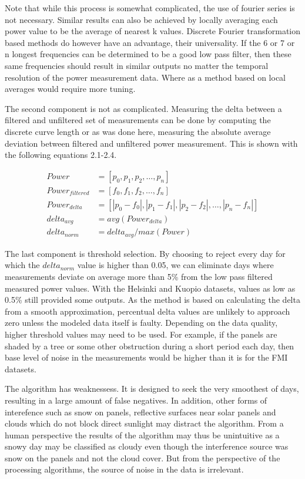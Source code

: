 Note that while this process is somewhat complicated, the use of fourier series is not necessary. Similar results can also be achieved by locally averaging each power value to be the average of nearest k values. Discrete Fourier transformation based methods do however have an advantage, their universality. If the 6 or 7 or n longest frequencies can be determined to be a good low pass filter, then these same frequencies should result in similar outputs no matter the temporal resolution of the power measurement data. Where as a method based on local averages would require more tuning.

The second component is not as complicated. Measuring the delta between a filtered and unfiltered set of measurements can be done by computing the discrete curve length or as was done here, measuring the absolute average deviation between filtered and unfiltered power measurement. This is shown with the following equations 2.1-2.4.


\begin{align}
Power &= [p_0, p_1, p_2, \dots , p_n] \\
Power_{filtered} &= [f_0, f_1, f_2, \dots , f_n] \\
Power_{delta} &= [|p_0 - f_0|, |p_1-f_1|, |p_2-f_2|, \dots , |p_n-f_n|] \\
delta_{avg} &= avg(Power_{delta}) \\
delta_{norm} &= delta_{avg}/ max(Power)
\end{align}


The last component is threshold selection. By choosing to reject every day for which the $delta_{norm}$ value is higher than 0.05, we can eliminate days where measurements deviate on average more than 5\% from the low pass filtered measured power values. With the Helsinki and Kuopio datasets, values as low as 0.5\% still provided some outputs. As the method is based on calculating the delta from a smooth approximation, percentual delta values are unlikely to approach zero unless the modeled data itself is faulty. Depending on the data quality, higher threshold values may need to be used. For example, if the panels are shaded by a tree or some other obstruction during a short period each day, then base level of noise in the measurements would be higher than it is for the FMI datasets.


The algorithm has weaknessess. It is designed to seek the very smoothest of days, resulting in a large amount of false negatives. In addition, other forms of interefence such as snow on panels, reflective surfaces near solar panels and clouds which do not block direct sunlight may distract the algorithm. From a human perspective the results of the algorithm may thus be unintuitive as a snowy day may be classified as cloudy even though the interference source was snow on the panels and not the cloud cover. But from the perspective of the processing algorithms, the source of noise in the data is irrelevant.

